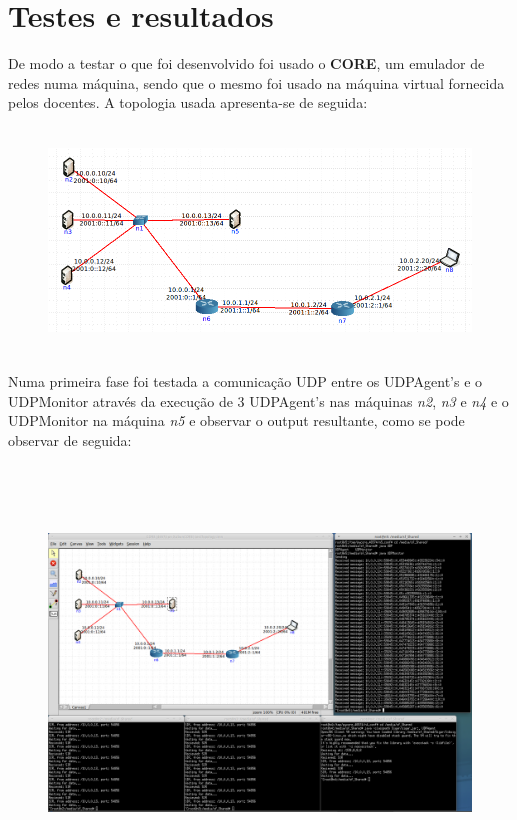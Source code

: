 \documentclass{article}
\begin{document}
\section{Testes e resultados}
De modo a testar o que foi desenvolvido foi usado o \textbf{CORE}, um emulador de redes numa máquina, sendo que o mesmo foi usado na máquina virtual fornecida pelos docentes. A topologia usada apresenta-se de seguida:
\begin{figure}[H]
	\centering
	\includegraphics[height=6cm]{topologia.png}
\end{figure}
Numa primeira fase foi testada a comunicação UDP entre os UDPAgent's e o UDPMonitor através da execução de 3 UDPAgent's nas máquinas \textit{n2}, \textit{n3} e \textit{n4} e o UDPMonitor na máquina \textit{n5} e observar o output resultante, como se pode observar de seguida:
\begin{figure}[H]
	\advance\leftskip-2cm
    \includegraphics[height=11cm]{teste1.png}
\end{figure}
\end{document}
